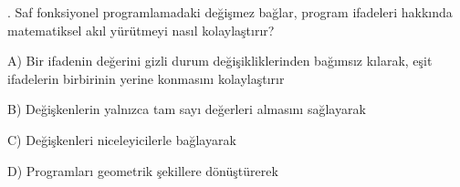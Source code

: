 \par\smallskip{}. Saf fonksiyonel programlamadaki değişmez bağlar, program ifadeleri hakkında matematiksel akıl yürütmeyi nasıl kolaylaştırır?

\par\noindent\hspace*{1.6em}A) Bir ifadenin değerini gizli durum değişikliklerinden bağımsız kılarak, eşit ifadelerin birbirinin yerine konmasını kolaylaştırır

\par\noindent\hspace*{1.6em}B) Değişkenlerin yalnızca tam sayı değerleri almasını sağlayarak

\par\noindent\hspace*{1.6em}C) Değişkenleri niceleyicilerle bağlayarak

\par\noindent\hspace*{1.6em}D) Programları geometrik şekillere dönüştürerek


